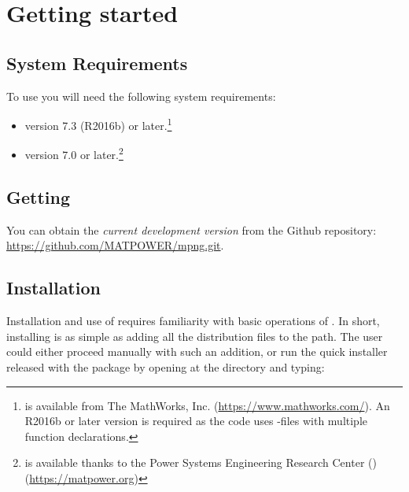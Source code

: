 \chapter{Getting started}
\label{chap:get_started}

\section{System Requirements}
\label{sec:requirements}

To use \mpng{} you will need the following system requirements:

\begin{itemize}
	\item[\checkmark] \matlab{}\textsuperscript{\tiny \textregistered} version 7.3 (R2016b) or later.\footnote{\matlab{} is available from The MathWorks, Inc. (\url{https://www.mathworks.com/}). An R2016b or later \matlab{} version is required as the \mpng{} code uses \matlab{}-files with multiple function declarations.}
	
	\item[\checkmark] \matpower{} version 7.0 or later.\footnote{\matpower{} is available thanks to the Power Systems Engineering Research Center (\pserc) (\url{https://matpower.org})}
\end{itemize}

\section{Getting \mpng{}}
\label{sec:get_mpng}

You can obtain the \emph{current development version} from the \matpower{} Github repository: \url{https://github.com/MATPOWER/mpng.git}.

\section{Installation}
\label{sec:install}

Installation and use of \mpng{} requires familiarity with basic operations of \matlab{}. In short, installing \mpng{} is as simple as adding all the distribution files to the \matlab{} path. The user could either proceed manually with such an addition, or run the quick installer released with the package by opening \matlab{} at the \mpngpath{} directory and typing:\\


